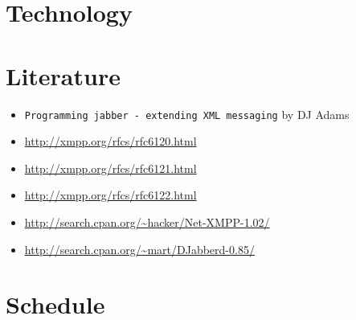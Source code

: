 \documentclass[a4paper,10pt,numbers=noendperiod]{scrartcl}
\begin{document}
\section{Technology}

\section{Literature}
\begin{itemize}
	\item \texttt{Programming jabber - extending XML messaging} by DJ Adams\\
	\item \url{http://xmpp.org/rfcs/rfc6120.html}\\
	\item \url{http://xmpp.org/rfcs/rfc6121.html}\\
	\item \url{http://xmpp.org/rfcs/rfc6122.html}\\
	\item \url{http://search.cpan.org/~hacker/Net-XMPP-1.02/}\\
	\item \url{http://search.cpan.org/~mart/DJabberd-0.85/}\\
\end{itemize}


\section{Schedule}
\end{document}
